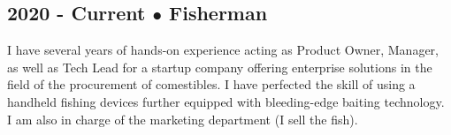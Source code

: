 \subsection{2020 - Current $\bullet$ Fisherman}
I have several years of hands-on experience acting as Product Owner, Manager, as well as Tech Lead for a startup company offering enterprise solutions in the field of the procurement of comestibles. I have perfected the skill of using a handheld fishing devices further equipped with bleeding-edge baiting technology.
I am also in charge of the marketing department (I sell the fish).
